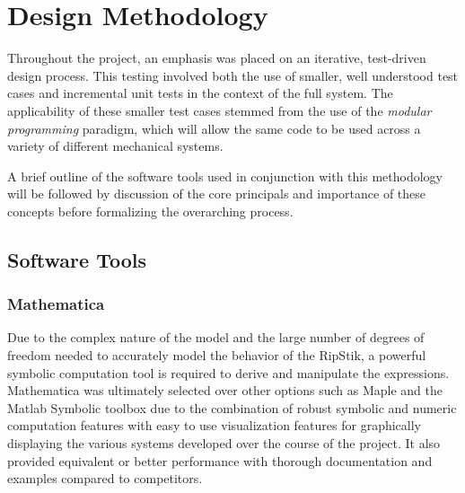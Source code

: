 \section{Design Methodology}
Throughout the project, an emphasis was placed on an iterative, test-driven design process. This testing involved both the use of smaller, well understood test cases and incremental unit tests in the context of the full system. 
The applicability of these smaller test cases stemmed from the use of the \textit{modular programming} paradigm, which will allow the same code to be used across a variety of different mechanical systems. 

A brief outline of the software tools used in conjunction with this methodology will be followed by discussion of the core principals and importance of these concepts before formalizing the overarching process.
\subsection{Software Tools}
\subsubsection{Mathematica}
Due to the complex nature of the model and the large number of degrees of freedom needed to accurately model the behavior of the RipStik, a powerful symbolic computation tool is required to derive and manipulate the expressions. 
Mathematica was ultimately selected over other options such as Maple and the Matlab Symbolic toolbox due to the combination of robust symbolic and numeric computation features with easy to use visualization features for graphically displaying the various systems developed over the course of the project.
It also provided equivalent or better performance with thorough documentation and examples compared to competitors.
